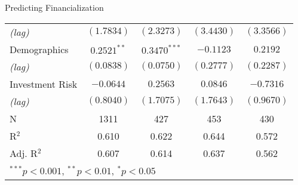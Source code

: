 \documentclass{beamer}
\begin{document}
\begin{frame}{\textmd{Predicting Financialization}}
\begin{table}
\begin{tiny}
\begin{center}
\begin{tabular}{l c c c c }
\hspace*{0.25cm} \emph{(lag)}& $(1.7834)$       & $(2.3273)$      & $(3.4430)$       & $(3.3566)$        \\[0.4ex]
Demographics & $0.2521^{**}$    & $0.3470^{***}$  & $-0.1123$        & $0.2192$          \\
\hspace*{0.25cm} \emph{(lag)}& $(0.0838)$       & $(0.0750)$      & $(0.2777)$       & $(0.2287)$        \\[0.4ex]
Investment Risk    & $-0.0644$        & $0.2563$        & $0.0846$         & $-0.7316$         \\
\hspace*{0.25cm} \emph{(lag)}& $(0.8040)$       & $(1.7075)$      & $(1.7643)$       & $(0.9670)$        \\[0.4ex]
\hline
N           & 1311           & 427             & 453            & 430            \\
R$^2$               & 0.610          & 0.622           & 0.644          & 0.572          \\
Adj. R$^2$          & 0.607          & 0.614           & 0.637          & 0.562          \\
\hline
\multicolumn{5}{l}{$^{***}p<0.001$, $^{**}p<0.01$, $^*p<0.05$}
\end{tabular}
\end{center}
\end{tiny}
\end{table}
\end{frame}
\end{document}

